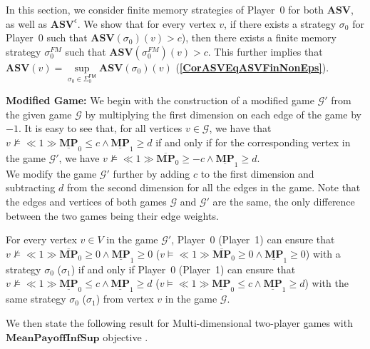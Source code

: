 In this section, we consider finite memory strategies of Player~$0$ for both $\mathbf{ASV}$, as well as $\mathbf{ASV}^\epsilon$. We show that for every vertex $v$, if there exists a strategy $\sigma_0$ for Player~0 such that $\mathbf{ASV}(\sigma_0)(v) > c$), then there exists a finite memory strategy $\sigma_0^{FM}$ such that $\mathbf{ASV}(\sigma_0^{FM})(v) > c$. This further implies that $\mathbf{ASV}(v) = \sup\limits_{\sigma_0 \in \Sigma_0^{\mathsf{FM}}} \mathbf{ASV}(\sigma_0)(v)$ (\textbf{\cref{CorASVEqASVFinNonEps}}).

\textbf{Modified Game:} We begin with the construction of a modified game $\mathcal{G'}$ from the given game $\mathcal{G}$ by multiplying the first dimension on each edge of the game by $-1$. It is easy to see that, for all vertices $v \in \mathcal{G}$, we have that $v \nvDash \ll 1 \gg \underline{\mathbf{MP}}_0 \leqslant c \land \underline{\mathbf{MP}}_1 \geqslant d$ if and only if for the corresponding vertex in the game $\mathcal{G'}$, we have $v \nvDash \ll 1 \gg \overline{\mathbf{MP}}_0 \geqslant -c \land \underline{\mathbf{MP}}_1 \geqslant d$.\\ 
\noindent We modify the game $\mathcal{G'}$ further by adding $c$ to the first dimension and subtracting $d$ from the second dimension for all the edges in the game. Note that the edges and vertices of both games $\mathcal{G}$ and $\mathcal{G'}$ are the same, the only difference between the two games being their edge weights.

\begin{proposition}
\label{PropGameStrEqNewGameStrNonEps}
For every vertex $v \in V$ in the game $\mathcal{G'}$, Player~0 (Player~1) can ensure that $v \nvDash \ll 1 \gg \overline{\mathbf{MP}}_0 \geqslant 0 \land \underline{\mathbf{MP}}_1 \geqslant 0$ ($v \models \ll 1 \gg \overline{\mathbf{MP}}_0 \geqslant 0 \land \underline{\mathbf{MP}}_1 \geqslant 0$) with a strategy $\sigma_0$ ($\sigma_1$) if and only if Player~0 (Player~1) can ensure that $v \nvDash \ll 1 \gg \underline{\mathbf{MP}}_0 \leqslant c \land \underline{\mathbf{MP}}_1 \geqslant d$ ($v \models \ll 1 \gg \underline{\mathbf{MP}}_0 \leqslant c \land \underline{\mathbf{MP}}_1 \geqslant d$) with the same strategy $\sigma_0$ ($\sigma_1$) from vertex $v$ in the game $\mathcal{G}$.
\end{proposition}

We then state the following result for Multi-dimensional two-player games with $\mathbf{MeanPayoffInfSup}$ objective \cite{VCDHRR15}.

